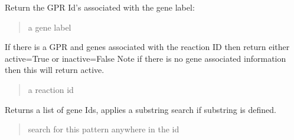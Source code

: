 \documentclass[letterpaper,12pt,english]{sphinxmanual}
\begin{document}
\begin{fulllineitems}
\begin{fulllineitems}
\label{\detokenize{api/core:cbmpy.CBModel.Model.getGPRIdAssociatedWithGeneLabel}}
\pysigstartsignatures
\pysiglinewithargsret
{}
{}
{}
\pysigstopsignatures
\sphinxAtStartPar
Return the GPR Id’s associated with the gene label:
\begin{quote}\begin{description}
\sphinxAtStartPar
{} \textendash{} a gene label

\end{description}\end{quote}

\end{fulllineitems}


\begin{fulllineitems}
\label{\detokenize{api/core:cbmpy.CBModel.Model.getReactionActivity}}
\pysigstartsignatures
\pysiglinewithargsret
{}
{}
{}
\pysigstopsignatures
\sphinxAtStartPar
If there is a GPR and genes associated with the reaction ID then return either active=True or inactive=False Note if there is no gene associated information then this will return active.
\begin{quote}\begin{description}
\sphinxAtStartPar
{} \textendash{} a reaction id

\end{description}\end{quote}

\end{fulllineitems}


\begin{fulllineitems}
\label{\detokenize{api/core:cbmpy.CBModel.Model.getGeneIds}}
\pysigstartsignatures
\pysiglinewithargsret
{}
{}
{}
\pysigstopsignatures
\sphinxAtStartPar
Returns a list of gene Ids, applies a substring search if substring is defined.
\begin{quote}\begin{description}
\sphinxAtStartPar
{} \textendash{} search for this pattern anywhere in the id


\end{description}
\end{quote}
\end{fulllineitems}
\end{fulllineitems}
\end{document}
